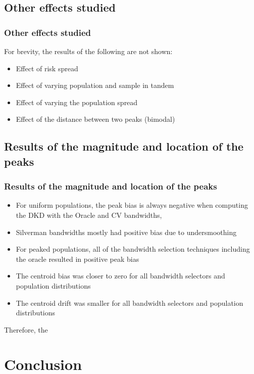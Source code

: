 \documentclass[notheorems]{beamer}
\theoremstyle{definition}
\theoremstyle{example}
\begin{document}
\subsection{Other effects studied}
\begin{frame}\frametitle{Other effects studied}
    For brevity, the results of the following are not shown:
    \\
    \begin{itemize}
        \item Effect of risk spread
        \item Effect of varying population and sample in tandem
        \item Effect of varying the population spread
        \item Effect of the distance between two peaks (bimodal)
    \end{itemize}
\end{frame}

\subsection{Results of the magnitude and location of the peaks}
\begin{frame}\frametitle{Results of the magnitude and location of the peaks}
    \footnotesize
    \begin{itemize}
        \item For uniform populations, the peak bias is always negative when computing the DKD with the Oracle and CV bandwidths,
        \item Silverman bandwidths mostly had positive bias due to undersmoothing
        \item For peaked populations, all of the bandwidth selection techniques including the oracle resulted in positive peak bias
        \item The centroid bias was closer to zero for all bandwidth selectors and population distributions
        \item The centroid drift was smaller for all bandwidth selectors and population distributions
    \end{itemize}
    Therefore, the 
\end{frame}

\section{Conclusion}
\end{document}

